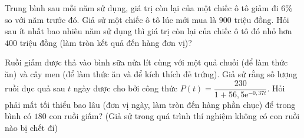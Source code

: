 \begin{ex}%
	Trung bình sau mỗi năm sử dụng, giá trị còn lại của một chiếc ô tô giảm đi $6 \%$ so với năm trước đó. Giả sử một chiếc ô tô lúc mới mua là $900$ triệu đồng. Hỏi sau ít nhất bao nhiêu năm sử dụng thì giá trị còn lại của chiếc ô tô đó nhỏ hơn $400$ triệu đồng (làm tròn kết quả đến hàng đơn vị)?
\end{ex}

\begin{ex}%
	Ruồi giấm được thả vào bình sữa nửa lít cùng với một quả chuối (để làm thức ăn) và cây men (để làm thức ăn và để kích thích đẻ trứng). Giả sử rằng số lượng ruồi đục quả sau $t$ ngày được cho bởi công thức $P(t)=\dfrac{230}{1+56{,}5\mathrm{e}^{-0{,}37t}}$. Hỏi phải mất tối thiểu bao lâu (đơn vị ngày, làm tròn đến hàng phần chục) để trong bình có $180$ con ruồi giấm? (Giả sử trong quá trình thí nghiệm không có con ruồi nào bị chết đi)
\end{ex}

